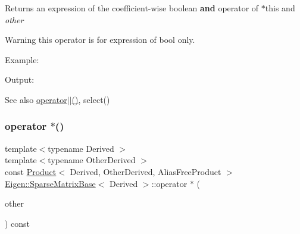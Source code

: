 \begin{DoxyReturn}{Returns}
an expression of the coefficient-\/wise boolean {\bfseries{and}} operator of {\ttfamily $\ast$this} and {\itshape other} 
\end{DoxyReturn}
\begin{DoxyWarning}{Warning}
this operator is for expression of bool only.
\end{DoxyWarning}
Example\+: 
\begin{DoxyCodeInclude}{0}
\end{DoxyCodeInclude}
 Output\+: 
\begin{DoxyVerbInclude}
\end{DoxyVerbInclude}


\begin{DoxySeeAlso}{See also}
\mbox{\hyperlink{class_eigen_1_1_sparse_matrix_base_a34225d20887df166fd66c9323fcef379}{operator$\vert$$\vert$()}}, select() 
\end{DoxySeeAlso}
\mbox{\label{class_eigen_1_1_sparse_matrix_base_a71198810da2882cf0234ad5a08d4500f}} 
\subsubsection{\texorpdfstring{operator $\ast$()}{operator *()}}
{\footnotesize\ttfamily template$<$typename Derived $>$ \\
template$<$typename Other\+Derived $>$ \\
const \mbox{\hyperlink{class_eigen_1_1_product}{Product}}$<$ Derived, Other\+Derived, Alias\+Free\+Product $>$ \mbox{\hyperlink{class_eigen_1_1_sparse_matrix_base}{Eigen\+::\+Sparse\+Matrix\+Base}}$<$ Derived $>$\+::operator $\ast$ (\begin{DoxyParamCaption}\item[{const \mbox{\hyperlink{class_eigen_1_1_sparse_matrix_base}{Sparse\+Matrix\+Base}}$<$ Other\+Derived $>$ \&}]{other }\end{DoxyParamCaption}) const\hspace{0.3cm}{\ttfamily [inline]}}

